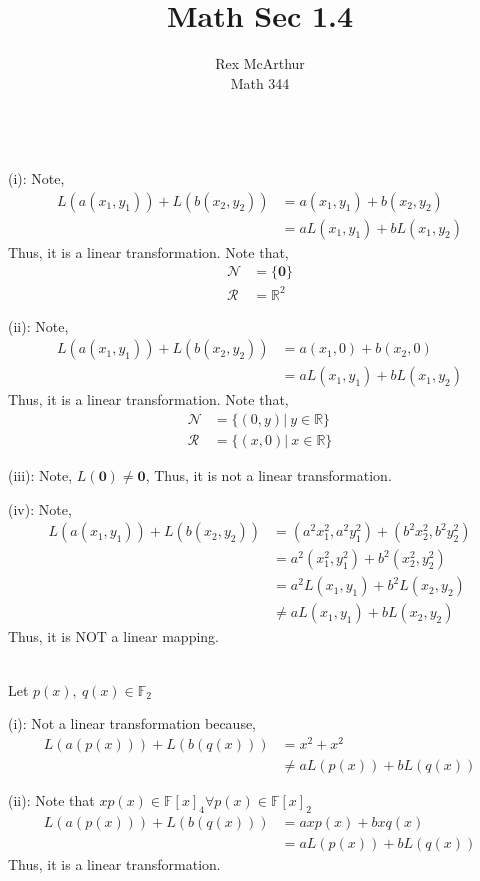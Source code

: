 \documentclass[letterpaper,12pt]{article}
\title{Math Sec 1.4}
\author{Rex McArthur\\Math 344}
\theoremstyle{definition}
\begin{document}
\maketitle
{}\\

(i): Note, 
\begin{align*}
    L(a(x_1,y_1))+L(b(x_2, y_2)) & = a(x_1, y_1) + b(x_2, y_2)\\
    & = aL(x_1, y_1)+bL(x_1, y_2)
\end{align*}
Thus, it is a linear transformation. Note that,
\begin{align*}
    \mathscr{N} & = \{\mathbf{0}\}\\
    \mathscr{R} & = \mathbb{R}^2
\end{align*}

(ii): Note, 
\begin{align*}
    L(a(x_1,y_1))+L(b(x_2, y_2)) & = a(x_1, 0) + b(x_2, 0)\\
    & = aL(x_1, y_1)+bL(x_1, y_2)
\end{align*}
Thus, it is a linear transformation. Note that,
\begin{align*}
    \mathscr{N} & = \{(0,y)|~y\in \mathbb{R}\}\\
    \mathscr{R} & = \{(x,0)|~x\in \mathbb{R}\}
\end{align*}


(iii): Note, $L( \mathbf{0} ) \neq \mathbf{0}$, 
Thus, it is not a linear transformation.

(iv): Note,
\begin{align*}
    L(a(x_1,y_1))+L(b(x_2, y_2)) & = (a^2 x_1^2, a^2 y_1^2) + (b^2 x_2^2, 
        b^2 y_2^2)\\
    & = a^2 (x_1^2, y_1^2) + b^2 (x_2^2, y_2^2)\\
    & = a^2 L(x_1, y_1) + b^2 L(x_2, y_2)\\
    & \neq a L(x_1, y_1) + b L(x_2, y_2)
\end{align*}
Thus, it is NOT a linear mapping.



\\
Let $p(x),~q(x) \in \mathbb{F}_2$

(i): Not a linear transformation because,
\begin{align*}
    L(a(p(x))) + L(b(q(x))) & = x^2 + x ^2 \\
    & \neq a L(p(x)) + b L (q(x))
\end{align*}

(ii): Note that $xp(x) \in \mathbb{F}[x]_4 \forall p(x) \in \mathbb{F}[x]_2$    
\begin{align*}
    L(a(p(x))) + L(b(q(x))) & = axp(x) + bxq(x) \\
    & = a L(p(x)) + b L(q(x))
\end{align*}
Thus, it is a linear transformation.
\end{document}
